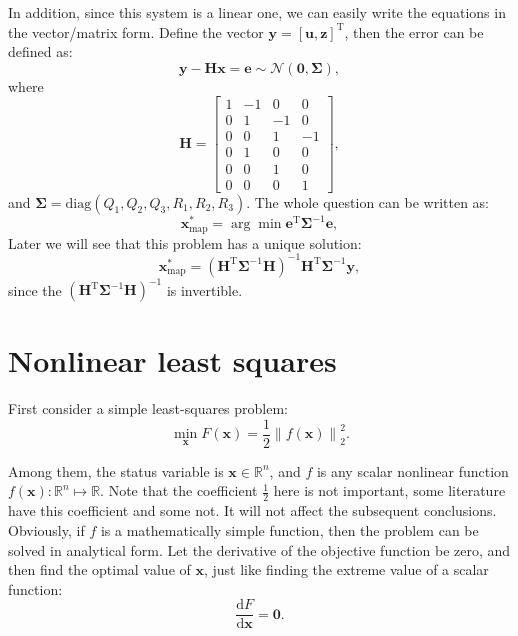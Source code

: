 In addition, since this system is a linear one, we can easily write the equations in the vector/matrix form. Define the vector $\mathbf{y}=[\mathbf{u}, \mathbf{z}]^\mathrm{T}$, then the error can be defined as:
\begin{equation}
    \mathbf{y}-\mathbf{H}\mathbf{x} = \mathbf{e} \sim \mathcal{N}(\mathbf{0}, \boldsymbol{\Sigma}),
\end{equation}
where
\begin{equation}
    \mathbf{H} = \left[ {\begin{array}{*{20}{c}}
            1&{-1}&0&0\\
            0&1&{-1}&0\\
            0&0&1&{-1}\\
            \hline
            0&1&0&0\\
            0&0&1&0\\
            0&0&0&1
    \end{array}} \right],
\end{equation}
and $\boldsymbol{\Sigma}=\mathrm{diag}(Q_1, Q_2, Q_3, R_1, R_2, R_3)$. The whole question can be written as:
\begin{equation}
    \mathbf{x}^*_{\mathrm{map}} = \arg \min \mathbf{e}^\mathrm{T} \boldsymbol{\Sigma}^{-1} \mathbf{e},
\end{equation}
Later we will see that this problem has a unique solution:
\begin{equation}
    \mathbf{x}^*_{\mathrm{map}} = (\mathbf{H}^\mathrm{T} \boldsymbol{\Sigma}^{-1} \mathbf{H})^{-1} \mathbf{H}^\mathrm{T} \boldsymbol{\Sigma}^{-1} \mathbf{y},
\end{equation}
since the $(\mathbf{H}^\mathrm{T} \boldsymbol{\Sigma}^{-1} \mathbf{H})^{-1}$ is invertible.

\section{Nonlinear least squares}
\label{sec:6.2}
First consider a simple least-squares problem:
\begin{equation}
    \mathop {\min }\limits_{\mathbf{x}} F(\mathbf{x}) = \frac{1}{2}{\left\| {f\left( \mathbf{x} \right) } \right\|^2_2}.
\end{equation}

Among them, the status variable is $\mathbf{x} \in \mathbb{R}^n$, and $f$ is any scalar nonlinear function $f(\mathbf{x}): \mathbb{R}^n \mapsto \mathbb{R}$. Note that the coefficient $\frac{1}{2}$ here is not important, some literature have this coefficient and some not. It will not affect the subsequent conclusions. Obviously, if $f$ is a mathematically simple function, then the problem can be solved in analytical form. Let the derivative of the objective function be zero, and then find the optimal value of $\mathbf{x}$, just like finding the extreme value of a scalar function:
\begin{equation}
    \frac{ \mathrm{d} F}{ \mathrm{d} \mathbf{x}} = \mathbf{0}.
\end{equation}


